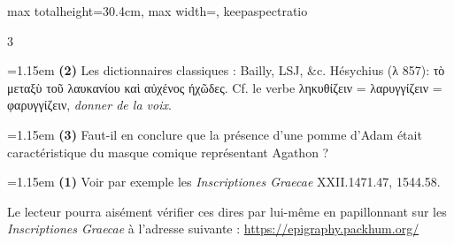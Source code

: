 \documentclass[11pt,twoside]{book}
\newcommand{\italique}[1]{\textit{#1}}
\newcommand{\LSJ}{LSJ}
\begin{document}
\begin{adjustbox}{max totalheight=30.4cm, max width=\textwidth, keepaspectratio}
\begin{minipage}{\textwidth}
{\begin{multicols}{3}
\par\vspace{1.5pt}
\noindent\hangindent=1.15em {\color{sepiaNote}\textbf{(2)}} Les dictionnaires classiques : Bailly, \LSJ, \&c. Hésychius (λ 857): τὸ μεταξὺ τοῦ λαυκανίου καὶ αὐχένος ήχῶδες. Cf. le verbe ληκυθίζειν = λαρυγγίζειν = φαρυγγίζειν, \italique{donner de la voix}.
\par\vspace{1.5pt}
\noindent\hangindent=1.15em {\color{sepiaNote}\textbf{(3)}} Faut-il en conclure que la présence d'une pomme d'Adam était caractéristique du masque comique représentant Agathon ?
\par\vspace{1.5pt}
\noindent\hangindent=1.15em {\color{sepiaNote}\textbf{(1)}} Voir par exemple les \italique{Inscriptiones Graecae} XXII.1471.47, 1544.58.
\par\vspace{1.5pt}
\noindent Le lecteur pourra aisément vérifier ces dires par lui-même en papillonnant sur les \italique{Inscriptiones Graecae} à l'adresse suivante : \href{https://epigraphy.packhum.org/}{https://epigraphy.packhum.org/}
\par\end{multicols}}
\end{minipage}\end{adjustbox}
\newpage
\end{document}
